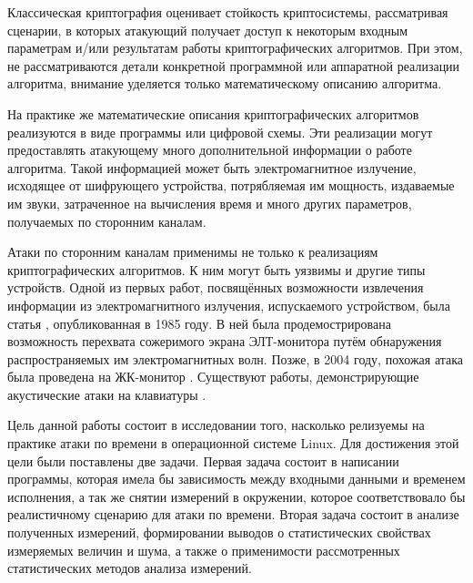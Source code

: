 
Классическая криптография оценивает стойкость криптосистемы, рассматривая
сценарии, в которых атакующий получает доступ к некоторым входным параметрам
и/или результатам работы криптографических алгоритмов. При этом, не
рассматриваются детали конкретной программной или аппаратной реализации
алгоритма, внимание уделяется только математическому описанию алгоритма.

На практике же математические описания криптографических алгоритмов реализуются
в виде программы или цифровой схемы. Эти реализации могут предоставлять
атакующему много дополнительной информации о работе алгоритма. Такой информацией
может быть электромагнитное излучение, исходящее от шифрующего устройства,
потрябляемая им мощность, издаваемые им звуки, затраченное на вычисления время и
много других параметров, получаемых по сторонним каналам.

Атаки по сторонним каналам применимы не только к реализациям криптографических
алгоритмов. К ним могут быть уязвимы и другие типы устройств. Одной из первых
работ, посвящённых возможности извлечения информации из электромагнитного
излучения, испускаемого устройством, была статья \cite{van-eck}, опубликованная
в 1985 году. В ней была продемострирована возможность перехвата сожеримого
экрана ЭЛТ-монитора путём обнаружения распространяемых им электромагнитных волн.
Позже, в 2004 году, похожая атака была проведена на ЖК-монитор \cite{kuhn}.
Существуют работы, демонстрирующие акустические атаки на клавиатуры \cite{asonov}.

Цель данной работы состоит в исследовании того, насколько релизуемы на практике
атаки по времени в операционной системе Linux. Для достижения этой цели были
поставлены две задачи. Первая задача состоит в написании программы, которая
имела бы зависимость между входными данными и временем исполнения, а так же
снятии измерений в окружении, которое соответствовало бы реалистичному сценарию
для атаки по времени. Вторая задача состоит в анализе полученных измерений,
формировании выводов о статистических свойствах измеряемых величин и шума, а
также о применимости рассмотренных статистических методов анализа измерений.

\clearpage
